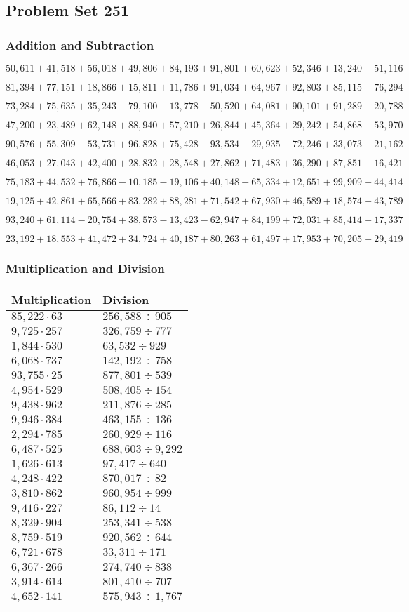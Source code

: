 \hypertarget{problem-set-251}{%
\subsection{Problem Set 251}\label{problem-set-251}}

\hypertarget{addition-and-subtraction}{%
\subsubsection{Addition and
Subtraction}\label{addition-and-subtraction}}

\(50,611+41,518+56,018+49,806+84,193+91,801+60,623+52,346+13,240+51,116\)

\(81,394+77,151+18,866+15,811+11,786+91,034+64,967+92,803+85,115+76,294\)

\(73,284+75,635+35,243-79,100-13,778-50,520+64,081+90,101+91,289-20,788\)

\(47,200+23,489+62,148+88,940+57,210+26,844+45,364+29,242+54,868+53,970\)

\(90,576+55,309-53,731+96,828+75,428-93,534-29,935-72,246+33,073+21,162\)

\(46,053+27,043+42,400+28,832+28,548+27,862+71,483+36,290+87,851+16,421\)

\(75,183+44,532+76,866-10,185-19,106+40,148-65,334+12,651+99,909-44,414\)

\(19,125+42,861+65,566+83,282+88,281+71,542+67,930+46,589+18,574+43,789\)

\(93,240+61,114-20,754+38,573-13,423-62,947+84,199+72,031+85,414-17,337\)

\(23,192+18,553+41,472+34,724+40,187+80,263+61,497+17,953+70,205+29,419\)

\hypertarget{multiplication-and-division}{%
\subsubsection{Multiplication and
Division}\label{multiplication-and-division}}

\begin{longtable}[]{@{}ll@{}}
\toprule
Multiplication & Division\tabularnewline
\midrule
\endhead
\(85,222\cdot63\) & \(256,588÷905\)\tabularnewline
\(9,725\cdot257\) & \(326,759÷777\)\tabularnewline
\(1,844\cdot530\) & \(63,532÷929\)\tabularnewline
\(6,068\cdot737\) & \(142,192÷758\)\tabularnewline
\(93,755\cdot25\) & \(877,801÷539\)\tabularnewline
\(4,954\cdot529\) & \(508,405÷154\)\tabularnewline
\(9,438\cdot962\) & \(211,876÷285\)\tabularnewline
\(9,946\cdot384\) & \(463,155÷136\)\tabularnewline
\(2,294\cdot785\) & \(260,929÷116\)\tabularnewline
\(6,487\cdot525\) & \(688,603÷9,292\)\tabularnewline
\(1,626\cdot613\) & \(97,417÷640\)\tabularnewline
\(4,248\cdot422\) & \(870,017÷82\)\tabularnewline
\(3,810\cdot862\) & \(960,954÷999\)\tabularnewline
\(9,416\cdot227\) & \(86,112÷14\)\tabularnewline
\(8,329\cdot904\) & \(253,341÷538\)\tabularnewline
\(8,759\cdot519\) & \(920,562÷644\)\tabularnewline
\(6,721\cdot678\) & \(33,311÷171\)\tabularnewline
\(6,367\cdot266\) & \(274,740÷838\)\tabularnewline
\(3,914\cdot614\) & \(801,410÷707\)\tabularnewline
\(4,652\cdot141\) & \(575,943÷1,767\)\tabularnewline
\bottomrule
\end{longtable}
